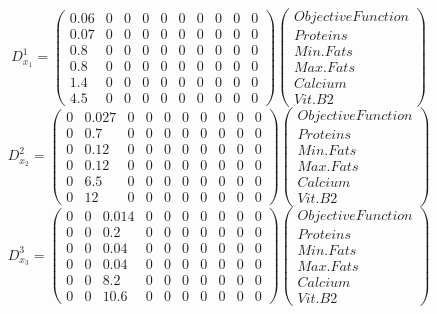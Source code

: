 \documentclass[a4paper,12pt]{article}
\begin{document}
\[
D^1_{x_1} = \begin{pmatrix}
0.06 & 0 & 0 & 0 & 0 & 0 & 0 & 0 & 0 & 0 \\ 
0.07 & 0 & 0 & 0 & 0 & 0 & 0 & 0 & 0 & 0 \\ 
0.8 & 0 & 0 & 0 & 0 & 0 & 0 & 0 & 0 & 0 \\ 
0.8 & 0 & 0 & 0 & 0 & 0 & 0 & 0 & 0 & 0 \\ 
1.4 & 0 & 0 & 0 & 0 & 0 & 0 & 0 & 0 & 0 \\ 
4.5 & 0 & 0 & 0 & 0 & 0 & 0 & 0 & 0 & 0 
\end{pmatrix}
\begin{pmatrix}
    Objective Function \\
    Proteins \\
    Min. Fats \\
    Max. Fats \\
    Calcium \\
    Vit. B2
\end{pmatrix}
\]
\[
D^2_{x_2} = \begin{pmatrix}
0 & 0.027 & 0 & 0 & 0 & 0 & 0 & 0 & 0 & 0 \\ 
0 & 0.7 & 0 & 0 & 0 & 0 & 0 & 0 & 0 & 0 \\ 
0 & 0.12 & 0 & 0 & 0 & 0 & 0 & 0 & 0 & 0 \\
0 & 0.12 & 0 & 0 & 0 & 0 & 0 & 0 & 0 & 0 \\
0 & 6.5 & 0 & 0 & 0 & 0 & 0 & 0 & 0 & 0 \\ 
0 & 12 & 0 & 0 & 0 & 0 & 0 & 0 & 0 & 0
\end{pmatrix}
\begin{pmatrix}
    Objective Function \\
    Proteins \\
    Min. Fats \\
    Max. Fats \\
    Calcium \\
    Vit. B2
\end{pmatrix}
\]
\[
D^3_{x_3} = \begin{pmatrix} 
0 & 0 & 0.014 & 0 & 0 & 0 & 0 & 0 & 0 & 0 \\
0 & 0 & 0.2 & 0 & 0 & 0 & 0 & 0 & 0 & 0 \\ 
0 & 0 & 0.04 & 0 & 0 & 0 & 0 & 0 & 0 & 0 \\
0 & 0 & 0.04 & 0 & 0 & 0 & 0 & 0 & 0 & 0 \\
0 & 0 & 8.2 & 0 & 0 & 0 & 0 & 0 & 0 & 0 \\
0 & 0 & 10.6 & 0 & 0 & 0 & 0 & 0 & 0 & 0
\end{pmatrix}
\begin{pmatrix}
    Objective Function \\
    Proteins \\
    Min. Fats \\
    Max. Fats \\
    Calcium \\
    Vit. B2
\end{pmatrix}
\]
\end{document}
